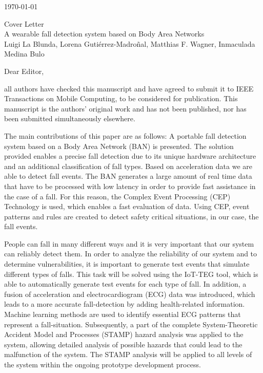 \documentclass[parskip]{scrartcl}
\begin{document}
 
\pagestyle{empty}

\begin{flushright}
    \Large
    \today
\end{flushright}

\begin{center}
    \huge
    Cover Letter\\
    \vspace{0.4cm}
    \LARGE
    A wearable fall detection system based on Body
    Area Networks\\
    \vspace{0.4cm}
    \large
    Luigi La Blunda, Lorena Gutiérrez-Madroñal, Matthias F. Wagner, Inmaculada Medina Bulo
\end{center}
 
    \vspace{0.8cm}

    \normalsize
Dear Editor,

all authors have checked this manuscript and have agreed to submit it to IEEE Transactions on Mobile Computing, to be considered for publication. This manuscript is the authors' original work and has not been published, nor has been submitted simultaneously elsewhere.

The main contributions of this paper are as follows:
A portable fall detection system based on a Body Area Network (BAN) is presented. The solution provided enables a precise fall detection due to its unique hardware architecture and an additional classification of fall types.
Based on acceleration data we are able to detect fall events.
The BAN generates a large amount of real time data that have to be processed with low latency in order to provide fast assistance in the case of a fall. For this reason, the Complex Event Processing (CEP) Technology is used, which enables a fast evaluation of data. Using CEP, event patterns and rules are created to detect safety critical situations, in our case, the fall events.

People can fall in many different ways and it is very important that our system can reliably detect them. In order to analyze the reliability of our system and to determine vulnerabilities, it is important to generate test events that simulate different types of falls. This task will be solved using the IoT-TEG tool, which is able to automatically generate test events for each type of fall. In addition, a fusion of acceleration and electrocardiogram (ECG) data was introduced, which leads to a more accurate fall-detection by adding health-related information. Machine learning methods are used to identify essential ECG patterns that represent a fall-situation. Subsequently, a part of the complete System-Theoretic Accident Model and Processes (STAMP) hazard analysis was applied to the system, allowing detailed analysis of possible hazards that could lead to the malfunction of the system. The STAMP analysis will be applied to all levels of the system within the ongoing prototype development process. \newpage
\end{document}
